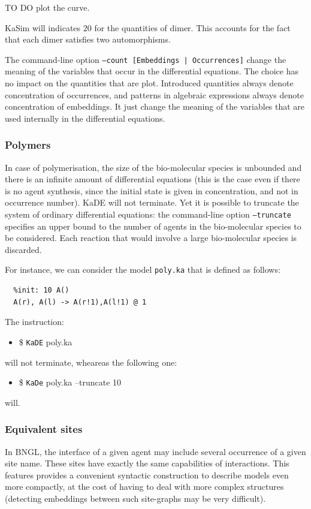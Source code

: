 \documentclass[11pt]{book}
\def\KaDE{\textsf{KaDE}}
\def\ttt#1{\texttt{#1}}
\def\ITE#1{\begin{itemize}#1\end{itemize}}
\begin{document}
TO DO plot the curve.

KaSim will indicates $20$ for the quantities of dimer.
This accounts for the fact that each dimer satisfies two automorphisms.


The command-line option \texttt{--count [Embeddings | Occurrences]}
change the meaning of the variables that occur in the differential equations. The choice has no impact on the quantities that are plot. Introduced quantities always denote
concentration of occurrences, and patterns in algebraic expressions always denote concentration of embeddings. It just change the meaning of the variables that are used internally in the differential equations.

\subsubsection{Polymers}

In case of polymerisation, the size of the bio-molecular species is unbounded and there is an infinite amount of differential equations (this is the case even if there is no agent synthesis, since the initial state is given in concentration, and not in occurrence number). {\KaDE} will not terminate. Yet it is possible to truncate the system of ordinary differential equations: the command-line option \texttt{--truncate} specifies an upper bound to the number of agents in the bio-molecular species to be considered. Each reaction that would involve a large bio-molecular species is discarded.

For instance, we can consider the model \texttt{poly.ka} that is defined as follows:
\begin{lstlisting}[language=kappa]
  %agent: A(l,r)
  %init: 10 A()
  A(r), A(l) -> A(r!1),A(l!1) @ 1
\end{lstlisting}

The instruction:
\ITE{\item[\$] \ttt{KaDE} poly.ka}
will not terminate, wheareas the following one:
\ITE{\item[\$] \ttt{KaDe} poly.ka --truncate 10}
will.


\subsubsection{Equivalent sites}

In BNGL, the interface of a given agent may include several occurrence of a given site name. These sites have exactly the same capabilities of interactions. This features provides a convenient syntactic construction to describe models even more compactly, at the cost of having to deal with more complex structures (detecting embeddings between such site-graphs may be very difficult).
\end{document}
